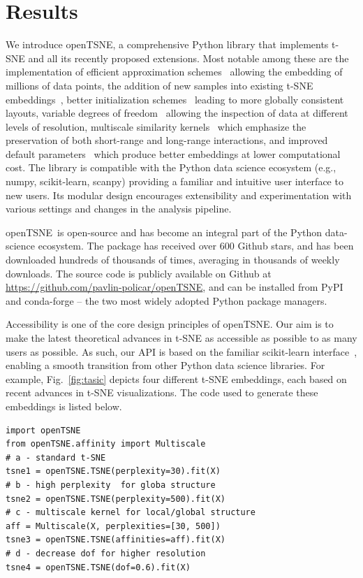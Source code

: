 \documentclass[twocolumn]{bmcart}
\newcommand{\opentsne}{\textsf{openTSNE}}
\begin{document}
\section*{Results}

We introduce \opentsne, a comprehensive Python library that implements t-SNE and all its recently proposed extensions. Most notable among these are the implementation of efficient approximation schemes~\cite{van2014accelerating,linderman2019fast} allowing the embedding of millions of data points, the addition of new samples into existing t-SNE embeddings~\cite{policar2019embedding}, better initialization schemes~\cite{kobak2019umap} leading to more globally consistent layouts, variable degrees of freedom~\cite{kobak2019heavy} allowing the inspection of data at different levels of resolution, multiscale similarity kernels~\cite{kobak2019art} which emphasize the preservation of both short-range and long-range interactions, and improved default parameters~\cite{belkina2019automated} which produce better embeddings at lower computational cost. The library is compatible with the Python data science ecosystem (e.g., \textsf{numpy}, \textsf{scikit-learn}, \textsf{scanpy}) providing a familiar and intuitive user interface to new users. Its modular design encourages extensibility and experimentation with various settings and changes in the analysis pipeline.

\opentsne\ is open-source and has become an integral part of the Python data-science ecosystem. The package has received over 600 Github stars, and has been downloaded hundreds of thousands of times, averaging in thousands of weekly downloads. The source code is publicly available on Github at \url{https://github.com/pavlin-policar/openTSNE}, and can be installed from \textsf{PyPI} and \textsf{conda-forge} -- the two most widely adopted Python package managers.

Accessibility is one of the core design principles of \opentsne. Our aim is to make the latest theoretical advances  in t-SNE as accessible as possible to as many users as possible. As such, our API is based on the familiar scikit-learn interface~\cite{sklearn_api}, enabling a smooth transition from other Python data science libraries. For example, Fig.~\ref{fig:tasic} depicts four different t-SNE embeddings, each based on recent advances in t-SNE visualizations. The code used to generate these embeddings is listed below.

\begin{verbatim}
import openTSNE
from openTSNE.affinity import Multiscale
# a - standard t-SNE
tsne1 = openTSNE.TSNE(perplexity=30).fit(X)
# b - high perplexity  for globa structure
tsne2 = openTSNE.TSNE(perplexity=500).fit(X)
# c - multiscale kernel for local/global structure
aff = Multiscale(X, perplexities=[30, 500])
tsne3 = openTSNE.TSNE(affinities=aff).fit(X)
# d - decrease dof for higher resolution
tsne4 = openTSNE.TSNE(dof=0.6).fit(X)
\end{verbatim}
\end{document}
